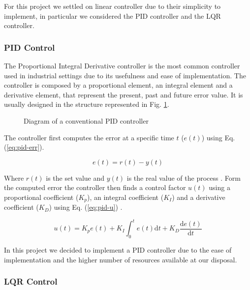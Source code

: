 For this project we settled on linear controller due to their simplicity to implement, in particular
we considered the PID controller and the LQR controller.

\subsubsection{PID Control}

The Proportional Integral Derivative controller is the most common controller used in industrial settings
due to its usefulness and ease of implementation. \autocite{IL23} The controller is composed by a proportional
element, an integral element and a derivative element, that represent the present, past and future error value\autocite{AM09}. 
It is usually designed in the structure represented in Fig. \ref{fig:pid}.

\begin{figure}
	\begin{center}
		
	\end{center}
	\caption{Diagram of a conventional PID controller}\label{fig:pid}
\end{figure}

The controller first computes the error at a specific time $t$ ($e(t)$) using Eq. (\ref{eq:pid-err}).

\begin{equation}
	e(t) = r(t) - y(t)
	\label{eq:pid-err}
\end{equation}

Where $r(t)$ is the set value and $y(t)$ is the real value of the process \autocite{AM09}. 
Form the computed error the controller then finds a control factor $u(t)$ using a proportional
coefficient ($K_p$), an integral coefficient ($K_I$) and a derivative coefficient ($K_D$) 
using Eq. (\ref{eq:pid-u}) \autocite{NH20}.

\begin{equation}
	u(t) = K_p e(t) + K_I \int^t_0 e(t) \mathrm{d} t + K_D \frac{\mathrm{d} e(t)}{\mathrm{d}t}
	\label{eq:pid-u}
\end{equation}

In this project we decided to implement a PID controller due to the ease of implementation and the 
higher number of resources available at our disposal.

\subsubsection{LQR Control}

